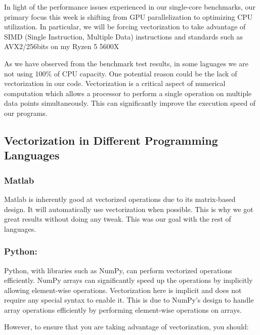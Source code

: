 In light of the performance issues experienced in our single-core benchmarks, our primary focus this week is shifting from GPU parallelization to optimizing CPU utilization. In particular, we will be forcing vectorization to take advantage of SIMD (Single Instruction, Multiple Data) instructions and standards such as AVX2/256bits on my Ryzen 5 5600X

As we have observed from the benchmark test results, in some laguages we are not using 100\% of CPU capacity. One potential reason could be the lack of vectorization in our code. Vectorization is a critical aspect of numerical computation which allows a processor to perform a single operation on multiple data points simultaneously. This can significantly improve the execution speed of our programs.

\clearpage

\subsection{Vectorization in Different Programming Languages}

\subsubsection*{Matlab}
Matlab is inherently good at vectorized operations due to its matrix-based design. It will automatically use vectorization when possible. This is why we got great results without doing any tweak. This was our goal with the rest of languages.

\subsubsection*{Python:} Python, with libraries such as NumPy, can perform vectorized operations efficiently. NumPy arrays can significantly speed up the operations by implicitly allowing element-wise operations. Vectorization here is implicit and does not require any special syntax to enable it. This is due to NumPy's design to handle array operations efficiently by performing element-wise operations on arrays.

However, to ensure that you are taking advantage of vectorization, you should:

